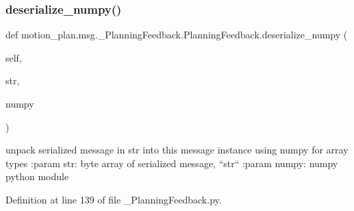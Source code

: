 \subsubsection{\texorpdfstring{deserialize\+\_\+numpy()}{deserialize\_numpy()}}
{\footnotesize\ttfamily def motion\+\_\+plan.\+msg.\+\_\+\+Planning\+Feedback.\+Planning\+Feedback.\+deserialize\+\_\+numpy (\begin{DoxyParamCaption}\item[{}]{self,  }\item[{}]{str,  }\item[{}]{numpy }\end{DoxyParamCaption})}

\begin{DoxyVerb}unpack serialized message in str into this message instance using numpy for array types
:param str: byte array of serialized message, ``str``
:param numpy: numpy python module
\end{DoxyVerb}
 

Definition at line 139 of file \+\_\+\+Planning\+Feedback.\+py.


